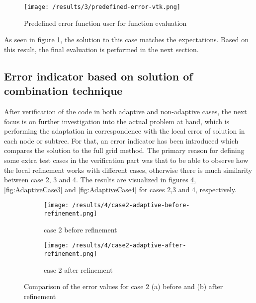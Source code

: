 
		
\begin{figure}[h]
	\centering
	    \texttt{[image: /results/3/predefined-error-vtk.png]}
		\centering    
	 \caption{Predefined error function user for function evaluation}
       \label{fig:PredefError}
\end{figure}

As seen in figure \ref{fig:PredefError}, the solution to this case matches the expectations. Based on this result, the final evaluation is performed in the next section.

\subsection{Error indicator based on solution of combination technique}
After verification of the code in both adaptive and non-adaptive cases, the next focus is on further investigation into the actual problem at hand, which is performing the adaptation in correspondence with the local error of solution in each node or subtree. For that, an error indicator has been introduced which compares the solution to the full grid method. The primary reason for defining some extra test cases in the verification part was that to be able to observe how the local refinement works with different cases, otherwise there is much similarity between case 2, 3 and 4. The results are visualized in figures \ref{fig:AdaptiveCase2}, \ref{fig:AdaptiveCase3} and \ref{fig:AdaptiveCase4} for cases 2,3 and 4, respectively. \\


\begin{figure}[h]
	\centering
    \begin{subfigure}[b]{0.49\textwidth}
	    \texttt{[image: /results/4/case2-adaptive-before-refinement.png]}
		\centering
        \caption{case 2 before refinement}
        \label{fig:AdaptiveCase2Before}
    \end{subfigure} 
    \begin{subfigure}[b]{0.49\textwidth}    
	    \texttt{[image: /results/4/case2-adaptive-after-refinement.png]}
		\centering    
	 \caption{case 2 after refinement}
       \label{fig:AdaptiveCase2After}
    \end{subfigure} 
    \caption{Comparison of the error values for case 2 (a) before and (b) after refinement}
    \label{fig:AdaptiveCase2}
\end{figure}

